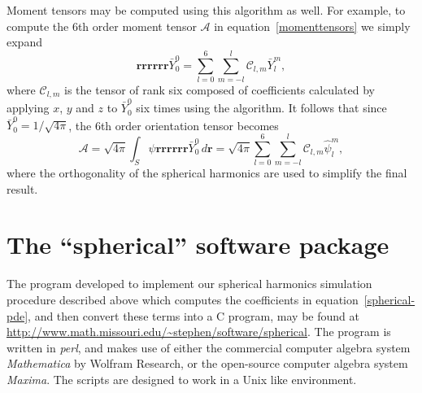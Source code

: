 \documentclass{amsart}
\newcommand\br{{\mathbf r}}
\begin{document}
Moment tensors may be computed using this algorithm as well. For example, to compute the 6th order moment tensor $\mathcal A$ in
equation~\eqref{momenttensors} we simply expand
\begin{equation}
\label{expand Y_0^0} \br\br\br\br\br\br \bar Y_0^0 = \sum_{l=0}^6
\sum_{m=-l}^l \mathcal C_{l,m} \bar Y_l^m,
\end{equation}
where $\mathcal C_{l,m}$ is the tensor of rank six composed of coefficients calculated by applying $x$, $y$ and $z$ to $\bar Y_0^0$ six times using the algorithm. It follows that since $\bar Y_0^0 = 1/\sqrt{4\pi}$, the 6th order orientation tensor
becomes
\begin{equation}
\label{moment tensor} \mathcal A = \sqrt{4\pi} \int_S \psi
\br\br\br\br\br\br \bar Y_0^0 \, d\br = \sqrt{4\pi} \sum_{l=0}^6
\sum_{m=-l}^l \mathcal C_{l,m} \hat\psi_l^m ,
\end{equation}
where the orthogonality of the spherical harmonics are used to simplify the final result.

\section{The ``spherical'' software package}

The program developed to implement our spherical harmonics
simulation procedure described above which computes the coefficients
in equation~\eqref{spherical-pde}, and then convert these terms into
a C program, may be found at
\url{http://www.math.missouri.edu/~stephen/software/spherical}. The
program is written in \emph{perl}, and makes use of either the
commercial computer algebra system \emph{Mathematica} by Wolfram
Research, or the open-source computer algebra system \emph{Maxima}.
The scripts are designed to work in a Unix like environment.
\end{document}
